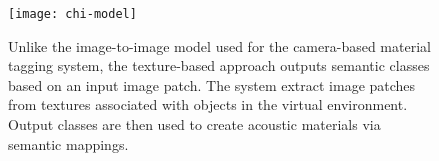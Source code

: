 \begin{landscape}
    \null\vfill
    \begin{figure}[htbp]
        \centering
        \texttt{[image: chi-model]}
        \caption[Texture-based acoustic material tagging model]{Unlike the image-to-image model used for the camera-based material tagging system, the texture-based approach outputs semantic classes based on an input image patch. The system extract image patches from textures associated with objects in the virtual environment. Output classes are then used to create acoustic materials via semantic mappings.}\label{fig:chi-model}
    \end{figure}
    \null\vfill
\end{landscape}